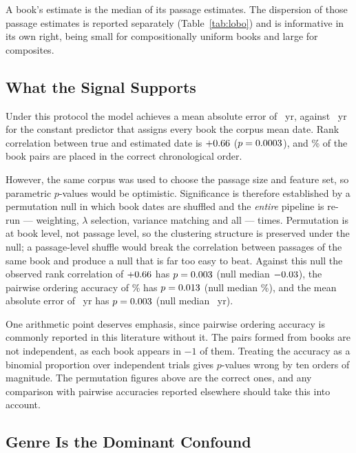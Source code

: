 \documentclass[10pt,letterpaper]{article}
\begin{document}
A book's estimate is the median of its passage estimates.  The dispersion of
those passage estimates is reported separately (Table~\ref{tab:lobo}) and is
informative in its own right, being small for compositionally uniform books and
large for composites.

\subsection*{What the Signal Supports}



Under this protocol the model achieves a mean absolute error of \HBmae~yr,
against \HBmaebase~yr for the constant predictor that assigns every book the
corpus mean date.  Rank correlation between true and estimated date is
$+0.66$ ($p = 0.0003$), and \HBpair\% of the \HBnpair{} book pairs are
placed in the correct chronological order.

However, the same corpus was used to choose the passage size and feature set,
so parametric $p$-values would be optimistic.  Significance is therefore
established by a permutation null in which book dates are shuffled and the
\emph{entire} pipeline is re-run --- weighting, $\lambda$ selection, variance
matching and all --- \HBnperm{} times.  Permutation is at book level, not
passage level, so the clustering structure is preserved under the null; a
passage-level shuffle would break the correlation between passages of the same
book and produce a null that is far too easy to beat.  Against this null the
observed rank correlation of $+0.66$ has $p = 0.003$ (null median
$-0.03$), the pairwise ordering accuracy of \HBpair\% has $p =
0.013$ (null median \HBnullpair\%), and the mean absolute error of
\HBmae~yr has $p = 0.003$ (null median \HBnullmae~yr).

One arithmetic point deserves emphasis, since pairwise ordering accuracy is
commonly reported in this literature without it.  The \HBnpair{} pairs formed
from \HBbooks{} books are not independent, as each book appears in
\HBbooks$-1$ of them.  Treating the accuracy as a binomial proportion over
\HBnpair{} independent trials gives $p$-values wrong by ten orders of magnitude.
The permutation figures above are the correct ones, and any comparison with
pairwise accuracies reported elsewhere should take this into account.

\subsection*{Genre Is the Dominant Confound}
\end{document}
